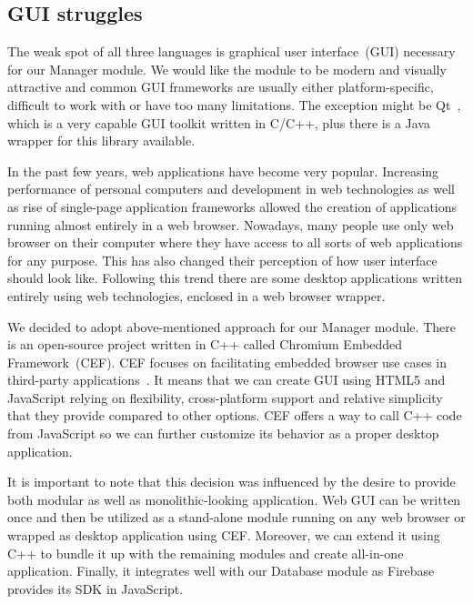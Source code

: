 \subsection{GUI struggles}

The weak spot of all three languages is graphical user interface~(GUI) necessary for our Manager module. We would like the module to be modern and visually attractive and common GUI frameworks are usually either platform-specific, difficult to work with or have too many limitations. The exception might be
Qt~\citep{qt}, which is a very capable GUI toolkit written in C/C++, plus there is a Java wrapper for this library available.
\par
In the past few years, web applications have become very popular. Increasing performance of personal computers and development in web technologies as well as rise of single-page application frameworks allowed the creation of applications running almost entirely in a web browser. Nowadays, many people use only web browser on their computer where they have access to all sorts of web applications for any purpose. This has also changed their perception of how user interface should look like. Following this trend there are some desktop applications written entirely using web technologies, enclosed in a web browser wrapper.
\par
We decided to adopt above-mentioned approach for our Manager module. There is an open-source project written in C++ called Chromium Embedded Framework~(CEF). CEF focuses on facilitating embedded browser use cases in third-party applications~\citep{cef}. It means that we can create GUI using HTML5 and JavaScript relying on flexibility, cross-platform support and relative simplicity that they provide compared to other options. CEF offers a way to call C++ code from JavaScript so we can further customize its behavior as a proper desktop application.
\par
It is important to note that this decision was influenced by the desire to provide both modular as well as monolithic-looking application. Web GUI can be written once and then be utilized as a stand-alone module running on any web browser or wrapped as desktop application using CEF. Moreover, we can extend it using C++ to bundle it up with the remaining modules and create all-in-one application. Finally, it integrates well with our Database module as Firebase provides its SDK in JavaScript.

